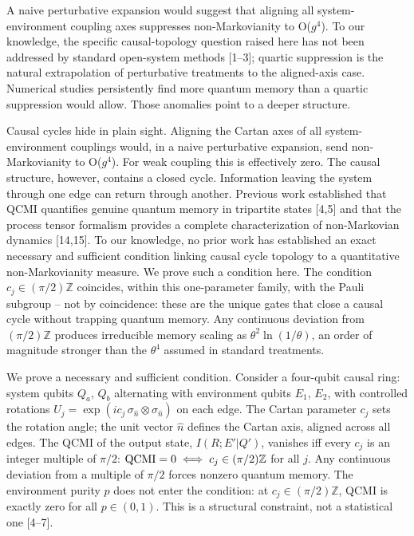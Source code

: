\documentclass[twocolumn,aps,prl,floatfix]{revtex4-2}
\begin{document}
A naive perturbative expansion would suggest that aligning all system-environment coupling axes suppresses non-Markovianity to O($g^4$). To our knowledge, the specific causal-topology question raised here has not been addressed by standard open-system methods [1--3]; quartic suppression is the natural extrapolation of perturbative treatments to the aligned-axis case. Numerical studies persistently find more quantum memory than a quartic suppression would allow. Those anomalies point to a deeper structure.

Causal cycles hide in plain sight. Aligning the Cartan axes of all system-environment couplings would, in a naive perturbative expansion, send non-Markovianity to O($g^4$). For weak coupling this is effectively zero. The causal structure, however, contains a closed cycle. Information leaving the system through one edge can return through another. Previous work established that QCMI quantifies genuine quantum memory in tripartite states [4,5] and that the process tensor formalism provides a complete characterization of non-Markovian dynamics [14,15]. To our knowledge, no prior work has established an exact necessary and sufficient condition linking causal cycle topology to a quantitative non-Markovianity measure. We prove such a condition here. The condition $c_j\in(\pi/2)\mathbb{Z}$ coincides, within this one-parameter family, with the Pauli subgroup -- not by coincidence: these are the unique gates that close a causal cycle without trapping quantum memory. Any continuous deviation from $(\pi/2)\mathbb{Z}$ produces irreducible memory scaling as $\theta^2\ln(1/\theta)$, an order of magnitude stronger than the $\theta^4$ assumed in standard treatments.

We prove a necessary and sufficient condition. Consider a four-qubit causal ring: system qubits $Q_a$, $Q_b$ alternating with environment qubits $E_1$, $E_2$, with controlled rotations $U_j = \exp(i c_j\,\sigma_{\hat{n}}\otimes\sigma_{\hat{n}})$ on each edge. The Cartan parameter $c_j$ sets the rotation angle; the unit vector $\hat{n}$ defines the Cartan axis, aligned across all edges. The QCMI of the output state, $I(R;E'|Q')$, vanishes iff every $c_j$ is an integer multiple of $\pi/2$: ${\rm QCMI}=0\iff c_j\in(\pi/2)\mathbb{Z}$ for all $j$. Any continuous deviation from a multiple of $\pi/2$ forces nonzero quantum memory. The environment purity $p$ does not enter the condition: at $c_j\in(\pi/2)\mathbb{Z}$, QCMI is exactly zero for all $p\in(0,1)$. This is a structural constraint, not a statistical one [4--7].
\end{document}
